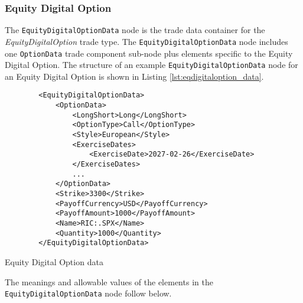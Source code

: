 \subsubsection{Equity Digital Option}

\ifdefined{}\fi

The \lstinline!EquityDigitalOptionData!  node is the trade data container for the \emph{EquityDigitalOption} trade type. The \lstinline!EquityDigitalOptionData!  node includes one  \lstinline!OptionData! trade component sub-node  plus elements
specific to the Equity Digital  Option. The structure of an example \lstinline!EquityDigitalOptionData! node for an Equity Digital Option is shown in Listing
\ref{lst:eqdigitaloption_data}.

\begin{listing}[H]
\begin{verbatim}
        <EquityDigitalOptionData>
            <OptionData>
                <LongShort>Long</LongShort>
                <OptionType>Call</OptionType>
                <Style>European</Style>
                <ExerciseDates>
                    <ExerciseDate>2027-02-26</ExerciseDate>
                </ExerciseDates>
                ...
            </OptionData>
            <Strike>3300</Strike>
            <PayoffCurrency>USD</PayoffCurrency>
            <PayoffAmount>1000</PayoffAmount>
            <Name>RIC:.SPX</Name>
            <Quantity>1000</Quantity>
        </EquityDigitalOptionData>
\end{verbatim}
\caption{Equity Digital Option data}
\label{lst:eqdigitaloption_data}
\end{listing}

The meanings and allowable values of the elements in the \lstinline!EquityDigitalOptionData!  node follow below.

